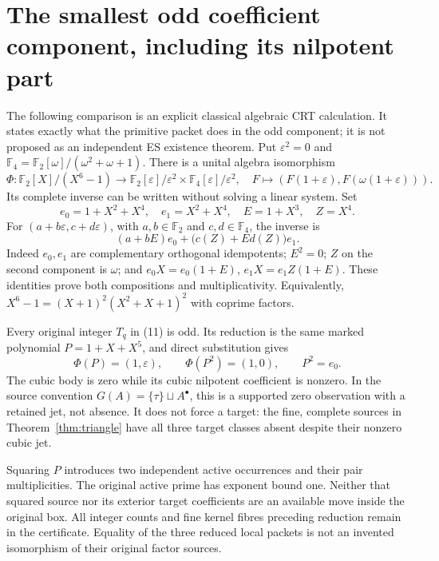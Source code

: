 \section{The smallest odd coefficient component, including its nilpotent part}
The following comparison is an explicit classical algebraic CRT calculation.
It states exactly what the primitive packet does in the odd component; it is
not proposed as an independent ES existence theorem.
Put $\varepsilon^2=0$ and $\mathbb F_4=\mathbb F_2[\omega]/(\omega^2+\omega+1)$.
There is a unital algebra isomorphism
\[
 \boxed{\Phi:\mathbb F_2[X]/(X^6-1)\longrightarrow
 \mathbb F_2[\varepsilon]/\varepsilon^2\times
 \mathbb F_4[\varepsilon]/\varepsilon^2,\quad
 F\mapsto(F(1+\varepsilon),F(\omega(1+\varepsilon))).}    \tag{17}
\]
Its complete inverse can be written without solving a linear system. Set
\[
 e_0=1+X^2+X^4,\quad e_1=X^2+X^4,\quad E=1+X^3,\quad Z=X^4.
\]
For $(a+b\varepsilon,c+d\varepsilon)$, with $a,b\in\mathbb F_2$ and
$c,d\in\mathbb F_4$, the inverse is
\[
 \boxed{(a+bE)e_0+\bigl(c(Z)+E d(Z)\bigr)e_1.}           \tag{18}
\]
Indeed $e_0,e_1$ are complementary orthogonal idempotents; $E^2=0$; $Z$ on the
second component is $\omega$; and $e_0X=e_0(1+E)$,
$e_1X=e_1Z(1+E)$. These identities prove both compositions and multiplicativity.
Equivalently, $X^6-1=(X+1)^2(X^2+X+1)^2$ with coprime factors.

Every original integer $T_q$ in (11) is odd. Its reduction is the same marked
polynomial $P=1+X+X^5$, and direct substitution gives
\[
 \boxed{\Phi(P)=(1,\varepsilon),\qquad
 \Phi(P^2)=(1,0),\qquad P^2=e_0.}                        \tag{19}
\]
The cubic body is zero while its cubic nilpotent coefficient is nonzero. In the
source convention $G(A)=\{\tau\}\sqcup A^\bullet$, this is a supported zero
observation with a retained jet, not absence. It does not force a target:
the fine, complete sources in Theorem~\ref{thm:triangle} have all three target
classes absent despite their nonzero cubic jet.

Squaring $P$ introduces two independent active occurrences and their pair
multiplicities. The original active prime has exponent bound one. Neither that
squared source nor its exterior target coefficients are an available move inside
the original box. All integer counts and fine kernel fibres preceding reduction
remain in the certificate. Equality of the three reduced local packets is not
an invented isomorphism of their original factor sources.

